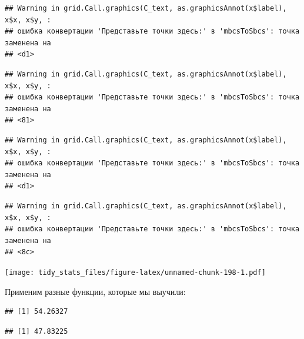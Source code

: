 \documentclass[]{book}
\newenvironment{Shaded}{\begin{snugshade}}{\end{snugshade}}
\newcommand{\KeywordTok}[1]{\textcolor[rgb]{0.13,0.29,0.53}{\textbf{#1}}}
\newcommand{\OperatorTok}[1]{\textcolor[rgb]{0.81,0.36,0.00}{\textbf{#1}}}
\newcommand{\NormalTok}[1]{#1}
\begin{document}
\begin{verbatim}
## Warning in grid.Call.graphics(C_text, as.graphicsAnnot(x$label), x$x, x$y, :
## ошибка конвертации 'Представьте точки здесь:' в 'mbcsToSbcs': точка заменена на
## <d1>
\end{verbatim}

\begin{verbatim}
## Warning in grid.Call.graphics(C_text, as.graphicsAnnot(x$label), x$x, x$y, :
## ошибка конвертации 'Представьте точки здесь:' в 'mbcsToSbcs': точка заменена на
## <81>
\end{verbatim}

\begin{verbatim}
## Warning in grid.Call.graphics(C_text, as.graphicsAnnot(x$label), x$x, x$y, :
## ошибка конвертации 'Представьте точки здесь:' в 'mbcsToSbcs': точка заменена на
## <d1>
\end{verbatim}

\begin{verbatim}
## Warning in grid.Call.graphics(C_text, as.graphicsAnnot(x$label), x$x, x$y, :
## ошибка конвертации 'Представьте точки здесь:' в 'mbcsToSbcs': точка заменена на
## <8c>
\end{verbatim}

\texttt{[image: tidy\_stats\_files/figure-latex/unnamed-chunk-198-1.pdf]}

Применим разные функции, которые мы выучили:

\begin{Shaded}
\end{Shaded}

\begin{verbatim}
## [1] 54.26327
\end{verbatim}

\begin{Shaded}
\end{Shaded}

\begin{verbatim}
## [1] 47.83225
\end{verbatim}

\begin{Shaded}
\end{Shaded}
\end{document}
